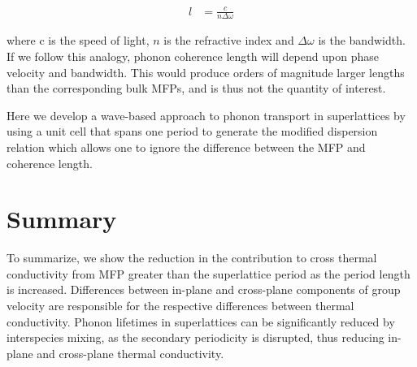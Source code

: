 \documentclass[aps,prb,preprint,preprintnumbers,amsmath,amssymb,floatfix,superscriptaddress]{revtex4}
\begin{document}
\begin{equation}\label{EQ:Coh2}
\begin{split}
l &= \frac{c}{n\Delta \omega} 
\end{split}
\end{equation}

where c is the speed of light, $n$ is the refractive index and $\Delta \omega$ is the bandwidth. If we follow this analogy, phonon coherence length will depend upon phase velocity and bandwidth. This would produce orders of magnitude larger lengths than the corresponding bulk MFPs, and is thus not the quantity of interest.



Here we develop a wave-based approach to phonon transport in superlattices by using a unit cell that spans one period to generate the modified dispersion relation which allows one to ignore the difference between the MFP and coherence length.

\section{Summary}

To summarize, we show the reduction in the contribution to cross thermal conductivity from MFP greater than the superlattice period as the period length is increased. Differences between in-plane and cross-plane components of group velocity are responsible for the respective differences between thermal conductivity. Phonon lifetimes in superlattices can be significantly reduced by interspecies mixing, as the secondary periodicity is disrupted, thus reducing in-plane and cross-plane thermal conductivity. 

\newpage
%

\end{document}
